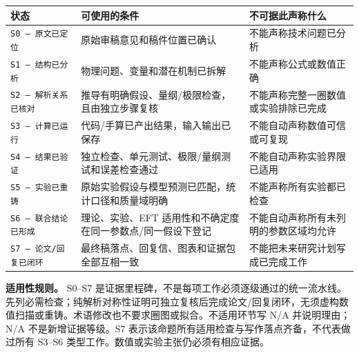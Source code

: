 \documentclass[
  chinese,
  UTF8]{ctexart}
\newcounter{none} %
\begin{document}
{\def\LTcaptype{none} %
\begin{longtable}[]{@{}
  >{\raggedright\arraybackslash}p{}
  >{\raggedright\arraybackslash}p{}
  >{\raggedright\arraybackslash}p{}@{}}
\toprule\noalign{}
\begin{minipage}[b]{\linewidth}\raggedright
状态
\end{minipage} & \begin{minipage}[b]{\linewidth}\raggedright
可使用的条件
\end{minipage} & \begin{minipage}[b]{\linewidth}\raggedright
不可据此声称什么
\end{minipage} \\
\midrule\noalign{}
\endhead
\bottomrule\noalign{}
\endlastfoot
\texttt{S0\ —\ 原文已定位} & 原始审稿意见和稿件位置已确认 &
不能声称技术问题已分析 \\
\texttt{S1\ —\ 结构已分析} & 物理问题、变量和潜在机制已拆解 &
不能声称公式或数值正确 \\
\texttt{S2\ —\ 解析关系已核对} &
推导有明确假设、量纲/极限检查，且由独立步骤复核 &
不能声称完整一圈数值或实验排除已完成 \\
\texttt{S3\ —\ 计算已运行} & 代码/手算已产出结果，输入输出已保存 &
不能自动声称数值可信或可复现 \\
\texttt{S4\ —\ 结果已验证} &
独立检查、单元测试、极限/量纲测试和误差检查通过 &
不能自动声称实验界限已适用 \\
\texttt{S5\ —\ 实验已重铸} &
原始实验假设与模型预测已匹配，统计口径和质量域明确 &
不能声称所有实验都已检查 \\
\texttt{S6\ —\ 联合结论已形成} & 理论、实验、EFT
适用性和不确定度在同一参数点/同一假设下登记 &
不能自动声称所有未列明的参数区域均允许 \\
\texttt{S7\ —\ 论文/回复已闭环} &
最终稿落点、回复信、图表和证据包全部互相一致 &
不能把未来研究计划写成已完成工作 \\
\end{longtable}
}

\textbf{适用性规则。} S0--S7
是证据里程碑，不是每项工作必须逐级通过的统一流水线。先列必需检查；纯解析对称性证明可独立复核后完成论文/回复闭环，无须虚构数值扫描或重铸。术语修改也不要求圈图或拟合。不适用环节写
N/A 并说明理由；N/A 不是新增证据等级。S7
表示该命题所有适用检查与写作落点齐备，不代表做过所有 S3--S6
类型工作。数值或实验主张仍必须有相应证据。
\end{document}
